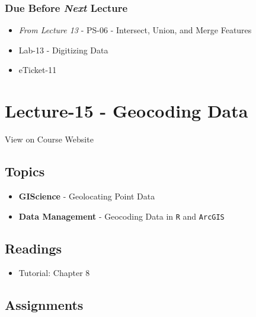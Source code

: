 \documentclass[
]{book}
\providecommand{\tightlist}{%
  \setlength{\itemsep}{0pt}\setlength{\parskip}{0pt}}
\begin{document}
\hypertarget{due-before-next-lecture-12}{%
\subsubsection*{\texorpdfstring{Due Before \emph{Next} Lecture}{Due Before Next Lecture}}\label{due-before-next-lecture-12}}

\begin{itemize}
\tightlist
\item
  \emph{From Lecture 13} - PS-06 - Intersect, Union, and Merge Features
\item
  Lab-13 - Digitizing Data
\item
  eTicket-11
\end{itemize}

\hypertarget{lecture-15---geocoding-data}{%
\section*{Lecture-15 - Geocoding Data}\label{lecture-15---geocoding-data}}

View on Course Website

\hypertarget{topics-15}{%
\subsection*{Topics}\label{topics-15}}

\begin{itemize}
\tightlist
\item
  \textbf{GIScience} - Geolocating Point Data
\item
  \textbf{Data Management} - Geocoding Data in \texttt{R} and \texttt{ArcGIS}
\end{itemize}

\hypertarget{readings-15}{%
\subsection*{Readings}\label{readings-15}}

\begin{itemize}
\tightlist
\item
  Tutorial: Chapter 8
\end{itemize}

\hypertarget{assignments-16}{%
\subsection*{Assignments}\label{assignments-16}}
\end{document}
